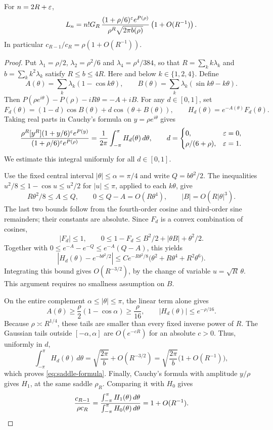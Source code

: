 \begin{theorem}\label{thm:saddle}
For $n=2R+\varepsilon$,
\begin{equation}\label{eq:saddle-formula}
 L_n=n!G_R\,
 \frac{(1+\rho/6)^\varepsilon e^{P(\rho)}}
      {\rho^R\sqrt{2\pi b(\rho)}}
       \left(1+O(R^{-1})\right).
\end{equation}
In particular $c_{R-1}/c_R=\rho(1+O(R^{-1}))$.
\end{theorem}
\begin{proof}
Put $\lambda_1=\rho/2$, $\lambda_2=\rho^2/6$ and
$\lambda_4=\rho^4/384$, so that
$R=\sum_k k\lambda_k$ and $b=\sum_k k^2\lambda_k$ satisfy
$R\leq b\leq4R$. Here and below $k\in\{1,2,4\}$. Define
\[
 A(\theta)=\sum_k\lambda_k(1-\cos k\theta),\qquad
 B(\theta)=\sum_k\lambda_k(\sin k\theta-k\theta).
\]
Then $P(\rho e^{i\theta})-P(\rho)-iR\theta=-A+iB$.
For any $d\in[0,1]$, set
\[
 F_d(\theta)=(1-d)\cos B(\theta)+d\cos(\theta+B(\theta)),\qquad
 H_d(\theta)=e^{-A(\theta)}F_d(\theta).
\]
Taking real parts in Cauchy's formula on $y=\rho e^{i\theta}$ gives
\[
 \frac{\rho^R[y^R](1+y/6)^\varepsilon e^{P(y)}}
      {(1+\rho/6)^\varepsilon e^{P(\rho)}}
 =\frac1{2\pi}\int_{-\pi}^{\pi}H_d(\theta)\,d\theta,
 \qquad d=\begin{cases}0,&\varepsilon=0,\\ \rho/(6+\rho),&\varepsilon=1.\end{cases}
\]
We estimate this integral uniformly for all $d\in[0,1]$.

Use the fixed central interval $|\theta|\leq\alpha=\pi/4$ and write
$Q=b\theta^2/2$. The inequalities
$u^2/8\leq1-\cos u\leq u^2/2$ for $|u|\leq\pi$, applied to each
$k\theta$, give
\[
 R\theta^2/8\leq A\leq Q,\qquad
 0\leq Q-A=O(R\theta^4),\qquad |B|=O(R|\theta|^3).
\]
The last two bounds follow from the fourth-order cosine and third-order
sine remainders; their constants are absolute. Since $F_d$ is a convex
combination of cosines,
\[
 |F_d|\leq1,\qquad
 0\leq1-F_d\leq B^2/2+|\theta B|+\theta^2/2.
\]
Together with
$0\leq e^{-A}-e^{-Q}\leq e^{-A}(Q-A)$, this yields
\[
 |H_d(\theta)-e^{-b\theta^2/2}|
 \leq C e^{-R\theta^2/8}
       \bigl(\theta^2+R\theta^4+R^2\theta^6\bigr).
\]
Integrating this bound gives $O(R^{-3/2})$, by the change of variable
$u=\sqrt R\,\theta$. This argument requires no smallness assumption on $B$.

On the entire complement $\alpha\leq|\theta|\leq\pi$, the linear term
alone gives
\[
 A(\theta)\geq\frac\rho2(1-\cos\alpha)\geq\frac\rho{16},\qquad
 |H_d(\theta)|\leq e^{-\rho/16}.
\]
Because $\rho\asymp R^{1/4}$, these tails are smaller than every fixed
inverse power of $R$. The Gaussian tails outside $[-\alpha,\alpha]$
are $O(e^{-cR})$ for an absolute $c>0$. Thus, uniformly in $d$,
\[
 \int_{-\pi}^{\pi}H_d(\theta)\,d\theta
 =\sqrt{\frac{2\pi}{b}}+O(R^{-3/2})
 =\sqrt{\frac{2\pi}{b}}\bigl(1+O(R^{-1})\bigr),
\]
which proves \eqref{eq:saddle-formula}.
Finally, Cauchy's formula with amplitude $y/\rho$ gives $H_1$, at the
same saddle $\rho_R$. Comparing it with $H_0$ gives
\[
 \frac{c_{R-1}}{\rho c_R}
 =\frac{\int_{-\pi}^{\pi}H_1(\theta)\,d\theta}
        {\int_{-\pi}^{\pi}H_0(\theta)\,d\theta}
 =1+O(R^{-1}).\qedhere
\]
\end{proof}

